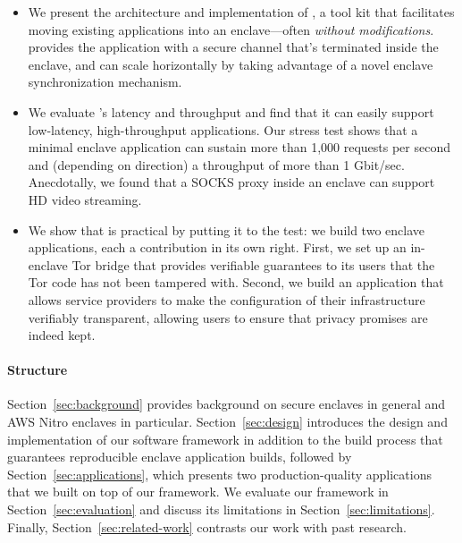 \begin{itemize}
  \item We present the architecture and implementation of \tool{}, a tool kit
    that facilitates moving existing applications into an enclave---often
    \emph{without modifications}.  \Tool{} provides the application with a
    secure channel that's terminated inside the enclave, and can scale
    horizontally by taking advantage of a novel enclave synchronization
    mechanism.

  \item We evaluate \tool{}'s latency and throughput and find that it can easily
    support low-latency, high-throughput applications.  Our stress test shows
    that a minimal enclave application can sustain more than 1,000 requests per
    second and (depending on direction) a throughput of more than 1 Gbit/sec.
    Anecdotally, we found that a SOCKS proxy inside an enclave can support HD
    video streaming.

  \item We show that \tool{} is practical by putting it to the test: we build
    two enclave applications, each a contribution in its own right.  First, we
    set up an in-enclave Tor bridge that provides verifiable guarantees to its
    users that the Tor code has not been tampered with.  Second, we build an
    application that allows service providers to make the configuration of their
    infrastructure verifiably transparent, allowing users to ensure that privacy
    promises are indeed kept.

\end{itemize}

\paragraph{Structure}

Section~\ref{sec:background} provides background on secure enclaves in general
and AWS Nitro enclaves in particular.  Section~\ref{sec:design} introduces the
design and implementation of our software framework in addition to the build
process that guarantees reproducible enclave application builds, followed by
Section~\ref{sec:applications}, which presents two production-quality
applications that we built on top of our framework.  We evaluate our framework
in Section~\ref{sec:evaluation} and discuss its limitations in
Section~\ref{sec:limitations}.  Finally, Section~\ref{sec:related-work}
contrasts our work with past research.
